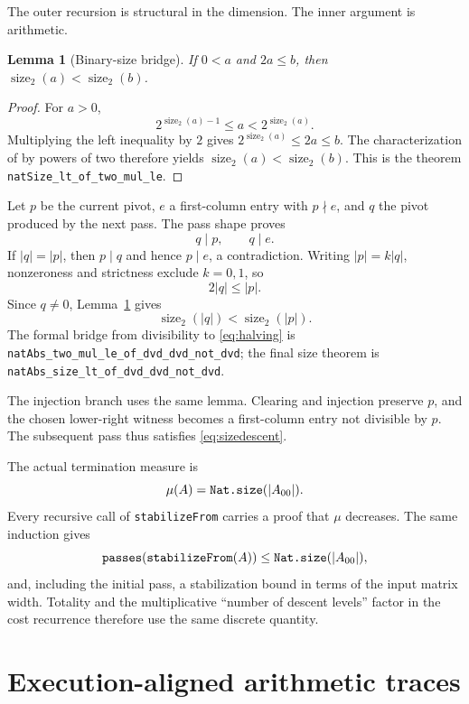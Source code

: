 \documentclass[11pt]{article}
\newtheorem{lemma}[theorem]{Lemma}
\theoremstyle{definition}
\newcommand{\natsize}{\operatorname{size}_2}
\newcommand{\code}[1]{\texttt{\detokenize{#1}}}
\newcommand{\decl}[1]{\nolinkurl{#1}}
\newcommand{\mcode}[1]{\text{\ttfamily\detokenize{#1}}}
\begin{document}
The outer recursion is structural in the dimension.  The inner argument is arithmetic.

\begin{lemma}[Binary-size bridge]
\label{lem:sizebridge}
If $0<a$ and $2a\le b$, then $\natsize(a)<\natsize(b)$.
\end{lemma}

\begin{proof}
For $a>0$,
\[
  2^{\natsize(a)-1}\le a<2^{\natsize(a)}.
\]
Multiplying the left inequality by $2$ gives $2^{\natsize(a)}\le2a\le b$.  The characterization of \code{Nat.size} by powers of two therefore yields $\natsize(a)<\natsize(b)$.  This is the theorem \decl{natSize_lt_of_two_mul_le}.
\end{proof}

Let $p$ be the current pivot, $e$ a first-column entry with $p\nmid e$, and $q$ the pivot produced by the next pass.  The pass shape proves
\[
  q\mid p,\qquad q\mid e.
\]
If $|q|=|p|$, then $p\mid q$ and hence $p\mid e$, a contradiction.  Writing $|p|=k|q|$, nonzeroness and strictness exclude $k=0,1$, so
\begin{equation}
  2|q|\le |p|.
  \label{eq:halving}
\end{equation}
Since $q\ne0$, Lemma~\ref{lem:sizebridge} gives
\begin{equation}
  \natsize(|q|)<\natsize(|p|).
  \label{eq:sizedescent}
\end{equation}
The formal bridge from divisibility to \eqref{eq:halving} is
\decl{natAbs_two_mul_le_of_dvd_dvd_not_dvd}; the final size theorem is
\decl{natAbs_size_lt_of_dvd_dvd_not_dvd}.

The injection branch uses the same lemma.  Clearing and injection preserve $p$, and the chosen lower-right witness becomes a first-column entry not divisible by $p$.  The subsequent pass thus satisfies \eqref{eq:sizedescent}.

The actual termination measure is
\[
  \mu(A)=\mcode{Nat.size}(|A_{00}|).
\]
Every recursive call of \decl{stabilizeFrom} carries a proof that $\mu$ decreases.  The same induction gives
\[
  \mcode{passes}(\mcode{stabilizeFrom}(A))
    \le \mcode{Nat.size}(|A_{00}|),
\]
and, including the initial pass, a stabilization bound in terms of the input matrix width.  Totality and the multiplicative ``number of descent levels'' factor in the cost recurrence therefore use the same discrete quantity.

\section{Execution-aligned arithmetic traces}
\label{sec:execution}
\end{document}
